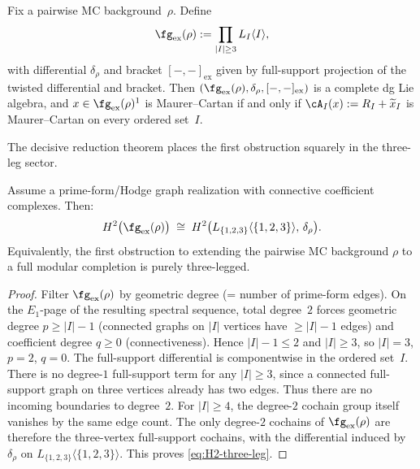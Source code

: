 \begin{definition}
\label{def:yangian-exact-support-dg-lie}
Fix a pairwise MC background~$\rho$. Define
\begin{equation}
 \fg_{\mathrm{ex}}(\rho)
 :=
 \prod_{|I| \ge 3} L_I\langle I\rangle,
\end{equation}
with differential $\delta_\rho$ and bracket $[-,-]_{\mathrm{ex}}$
given by full-support projection of the twisted differential and
bracket. Then $(\fg_{\mathrm{ex}}(\rho), \delta_\rho,
[-,-]_{\mathrm{ex}})$ is a complete dg Lie algebra, and $x \in
\fg_{\mathrm{ex}}(\rho)^1$ is Maurer--Cartan if and only if
$\cA_I(x) := R_I + \widetilde{x}_I$ is Maurer--Cartan on every
ordered set~$I$.
\end{definition}

The decisive reduction theorem places the first obstruction squarely
in the three-leg sector.

\begin{theorem}
\label{thm:yangian-H2-reduction}
Assume a prime-form/Hodge graph realization with connective
coefficient complexes. Then:
\begin{equation}\label{eq:H2-three-leg}
 H^2\bigl(\fg_{\mathrm{ex}}(\rho)\bigr)
 \;\cong\;
 H^2\bigl(L_{\{1,2,3\}}\langle\{1,2,3\}\rangle,\,\delta_\rho\bigr).
\end{equation}
Equivalently, the first obstruction to extending the pairwise MC
background $\rho$ to a full modular completion is purely
three-legged.
\end{theorem}

\begin{proof}
Filter $\fg_{\mathrm{ex}}(\rho)$ by geometric degree (= number of
prime-form edges). On the $E_1$-page of the resulting spectral
sequence, total degree~$2$ forces geometric degree $p \ge |I| - 1$
(connected graphs on $|I|$ vertices have $\ge |I|-1$ edges) and
coefficient degree $q \ge 0$ (connectiveness). Hence
$|I| - 1 \le 2$ and $|I| \ge 3$, so $|I| = 3$, $p = 2$, $q = 0$.
The full-support differential is componentwise in the ordered set~$I$.
There is no degree-$1$ full-support term for any \(|I|\ge3\), since a
connected full-support graph on three vertices already has two edges.
Thus there are no incoming boundaries to degree~$2$. For
\(|I|\ge4\), the degree-$2$ cochain group itself vanishes by the same
edge count. The only degree-$2$ cochains of
\(\fg_{\mathrm{ex}}(\rho)\) are therefore the three-vertex
full-support cochains, with the differential induced by
\(\delta_\rho\) on
\(L_{\{1,2,3\}}\langle\{1,2,3\}\rangle\). This proves
\eqref{eq:H2-three-leg}.
\end{proof}

